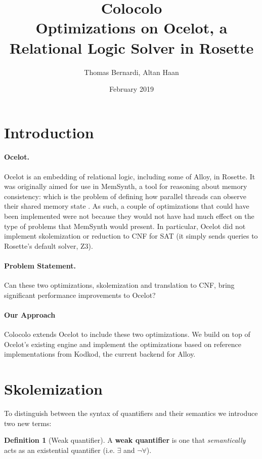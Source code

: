 \documentclass[10pt]{article}
\title{Colocolo\\\large Optimizations on Ocelot, a Relational Logic Solver in Rosette}
\date{February 2019}
\author{Thomas Bernardi, Altan Haan}
\theoremstyle{definition}
\newtheorem{definition}{Definition}[section]
\begin{document}
	\maketitle

  \section{Introduction}

  \paragraph{Ocelot.} Ocelot is an embedding of relational logic, including some of Alloy, in Rosette. It was originally aimed for use in MemSynth, a tool for reasoning about memory consistency: which is the problem of defining how parallel threads can observe their shared memory state \cite{bornholdt17}. As such, a couple of optimizations that could have been implemented were not because they would not have had much effect on the type of problems that MemSynth would present. In particular, Ocelot did not implement skolemization or reduction to CNF for SAT (it simply sends queries to Rosette's default solver, Z3).

  \paragraph{Problem Statement.} Can these two optimizations, skolemization and translation to CNF, bring significant performance improvements to Ocelot?
  
  \paragraph{Our Approach} Colocolo extends Ocelot to include these two optimizations. We build on top of Ocelot's existing engine and implement the optimizations based on reference implementations from Kodkod, the current backend for Alloy.

  \section{Skolemization}\label{sec:skolems}

  To distinguish between the syntax of quantifiers and their semantics we introduce two new terms:\\
  \theoremstyle{definition}
  \begin{definition}[Weak quantifier]
      A \textbf{weak quantifier} is one that \emph{semantically} acts as an existential quantifier (i.e. $\exists$ and $\neg \forall$).
  \end{definition}
\end{document}
